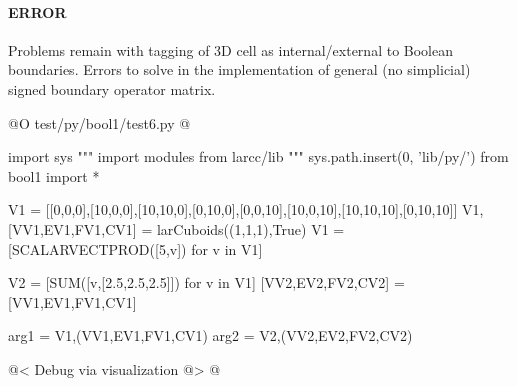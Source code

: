 \documentclass[11pt,oneside]{article}	%
\begin{document}

\paragraph{ERROR}

Problems remain with tagging of 3D cell as internal/external to Boolean boundaries. Errors to solve in the implementation of  general (no simplicial) signed boundary operator matrix.


@O test/py/bool1/test6.py
@{
import sys
""" import modules from larcc/lib """
sys.path.insert(0, 'lib/py/')
from bool1 import *

V1 = [[0,0,0],[10,0,0],[10,10,0],[0,10,0],[0,0,10],[10,0,10],[10,10,10],[0,10,10]]
V1,[VV1,EV1,FV1,CV1] = larCuboids((1,1,1),True)
V1 = [SCALARVECTPROD([5,v]) for v in V1]

V2 = [SUM([v,[2.5,2.5,2.5]]) for v in V1]
[VV2,EV2,FV2,CV2] = [VV1,EV1,FV1,CV1]

arg1 = V1,(VV1,EV1,FV1,CV1)
arg2 = V2,(VV2,EV2,FV2,CV2)

@< Debug via visualization @>
@}
\end{document}

